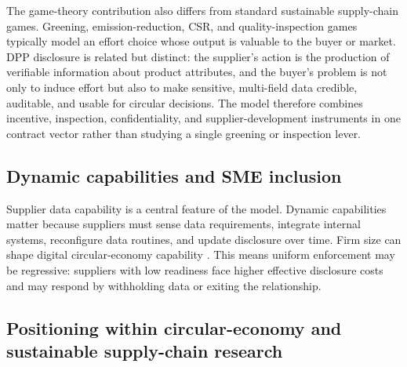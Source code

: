 \documentclass[final,5p,times,authoryear]{elsarticle}
\begin{document}
The game-theory contribution also differs from standard sustainable supply-chain games. Greening, emission-reduction, CSR, and quality-inspection games typically model an effort choice whose output is valuable to the buyer or market. DPP disclosure is related but distinct: the supplier's action is the production of verifiable information about product attributes, and the buyer's problem is not only to induce effort but also to make sensitive, multi-field data credible, auditable, and usable for circular decisions. The model therefore combines incentive, inspection, confidentiality, and supplier-development instruments in one contract vector rather than studying a single greening or inspection lever.

\subsection{Dynamic capabilities and SME inclusion}

Supplier data capability is a central feature of the model. Dynamic capabilities matter because suppliers must sense data requirements, integrate internal systems, reconfigure data routines, and update disclosure over time. Firm size can shape digital circular-economy capability \citep{uruena2026digital}. This means uniform enforcement may be regressive: suppliers with low readiness face higher effective disclosure costs and may respond by withholding data or exiting the relationship.

\subsection{Positioning within circular-economy and sustainable supply-chain research}
\end{document}
